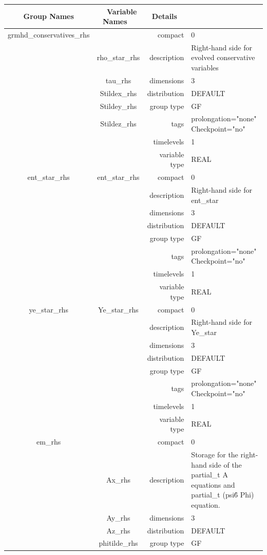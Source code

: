 \documentclass{article}
\begin{document}
\begin{tabular*}{150mm}{|c|c@{\extracolsep{\fill}}|rl|} \hline 
~ {\bf Group Names} ~ & ~ {\bf Variable Names} ~  &{\bf Details} ~ & ~ \\ 
\hline 
grmhd\_conservatives\_rhs &  & compact & 0 \\ 
 & rho\_star\_rhs & description & Right-hand side for evolved conservative variables \\ 
 & tau\_rhs & dimensions & 3 \\ 
 & Stildex\_rhs & distribution & DEFAULT \\ 
 & Stildey\_rhs & group type & GF \\ 
 & Stildez\_rhs & tags & prolongation="none" Checkpoint="no" \\ 
 &  & timelevels & 1 \\ 
 &  & variable type & REAL \\ 
\hline 
ent\_star\_rhs & ent\_star\_rhs & compact & 0 \\ 
 &  & description & Right-hand side for ent\_star \\ 
 &  & dimensions & 3 \\ 
 &  & distribution & DEFAULT \\ 
 &  & group type & GF \\ 
 &  & tags & prolongation="none" Checkpoint="no" \\ 
 &  & timelevels & 1 \\ 
 &  & variable type & REAL \\ 
\hline 
ye\_star\_rhs & Ye\_star\_rhs & compact & 0 \\ 
 &  & description & Right-hand side for Ye\_star \\ 
 &  & dimensions & 3 \\ 
 &  & distribution & DEFAULT \\ 
 &  & group type & GF \\ 
 &  & tags & prolongation="none" Checkpoint="no" \\ 
 &  & timelevels & 1 \\ 
 &  & variable type & REAL \\ 
\hline 
em\_rhs &  & compact & 0 \\ 
 & Ax\_rhs & description & Storage for the right-hand side of the partial\_t A equations and partial\_t (psi\^6 Phi) equation. \\ 
 & Ay\_rhs & dimensions & 3 \\ 
 & Az\_rhs & distribution & DEFAULT \\ 
 & phitilde\_rhs & group type & GF \\ 

\end{tabular*}
\end{document}
